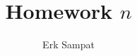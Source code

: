 

\title{Homework $n$}
\author{Erk Sampat}
\usepackage{lipsum}

\maketitle
\prob
\lipsum[][1-2]

\lipsum[][1-2]
\begin{pp}
	\lipsum[][1-2]
	
	\lipsum[][1-2]
	\begin{spart}
		\lipsum[][1-2]
		
		\lipsum[][1-2]
	\end{spart}
\end{pp}
\begin{pp}
	\lipsum[][1-2]
	
	\lipsum[][1-2]
	\begin{spart}
		\lipsum[][1-2]
		
		\lipsum[][1-2]
	\end{spart}
	\begin{spart}
		\lipsum[][1-2]
		
		\lipsum[][1-2]
	\end{spart}
	\begin{spart}
		\lipsum[][1-2]
		
		\lipsum[][1-2]
	\end{spart}
	\begin{spart}
		\lipsum[][1-2]
		
		\lipsum[][1-2]
	\end{spart}
\end{pp}
